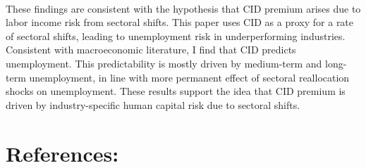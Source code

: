 \documentclass[12pt]{article}
\begin{document}
\paragraph{}
These findings are consistent with the hypothesis that CID premium arises due to labor income risk from sectoral shifts. This paper uses CID as a proxy for a rate of sectoral shifts, leading to unemployment risk in underperforming industries. Consistent with macroeconomic literature, I find that CID predicts unemployment. This predictability is mostly driven by medium-term and long-term unemployment, in line with more permanent effect of sectoral reallocation shocks on unemployment. These results support the idea that CID premium is driven by industry-specific human capital risk due to sectoral shifts.


\newpage
\section{References:}
\end{document}
